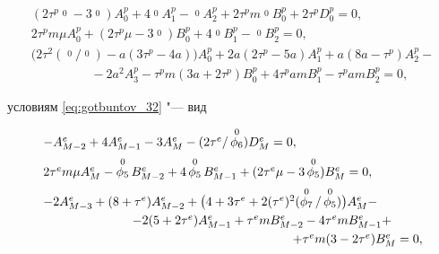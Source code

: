 \begin{equation}

\begin{array}{l}

(2\tau^p\mathop{\phi_1}\limits^{0}-3\mathop{\phi_2}\limits^{0})A_0^p+

4\mathop{\phi_2}\limits^{0}A_1^p-\mathop{\phi_2}\limits^{0}A_2^p+2\tau^p m\mathop{\phi_1}\limits^{0}B_0^p+2\tau^pD_0^p=0,

\\[2mm] 

2\tau^p m\mu A_0^p+(2\tau^p\mu-3\mathop{\phi_3}\limits^{0})B_0^p+

4\mathop{\phi_3}\limits^{0}B_1^p-\mathop{\phi_3}\limits^{0}B_2^p=0,

\\[2mm] 

\bigl(2\tau^2 (\mathop{\phi_4}\limits^{0}/ \mathop{\phi_5}\limits^{0})-a(3\tau^p-4a)\bigr)A_0^p+2a(2\tau^p-5a)A_1^p+a(8a-\tau^p)A_2^p-

\\[1mm] 

\hspace{2cm}

-2a^2A_3^p-\tau^p m(3a+2\tau^p)B_0^p+4\tau^p amB_1^p-\tau^p amB_2^p=0,

\end{array}

\label{eq:gotbuntov_41}

\end{equation}       

условиям \eqref{eq:gotbuntov_32} "--- вид

\begin{equation}

\begin{array}{l}

-A_{M-2}^e+4A_{M-1}^e-3A_M^e-(2\tau^e/ \mathop{\phi_6}\limits^{0})D_M^e=0,

\\[2mm] 

2\tau^e m\mu A_M^e-\mathop{\phi_5}\limits^{0} B_{M-2}^e+4\mathop{\phi_5}\limits^{0} B_{M-1}^e+(2\tau^e\mu-3\mathop{\phi_5}\limits^{0})B_M^e=0,

\\[2mm] 

-2A_{M-3}^e+(8+\tau^e)A_{M-2}^e+\bigl(4+3\tau^e+2(\tau^e)^2(\mathop{\phi_7}\limits^{0}/ \mathop{\phi_5}\limits^{0})\bigr)A_M^e-

\\[1mm] 

\hspace{2.5cm}

-2(5+2\tau^e)A_{M-1}^e+\tau^e mB_{M-2}^e-4\tau^e mB_{M-1}^e+

\\[1mm] 

\hspace{7cm}

+

\tau^e m(3-2\tau^e)B_M^e=0,   

\end{array}              

\label{eq:gotbuntov_43}

\end{equation} 

